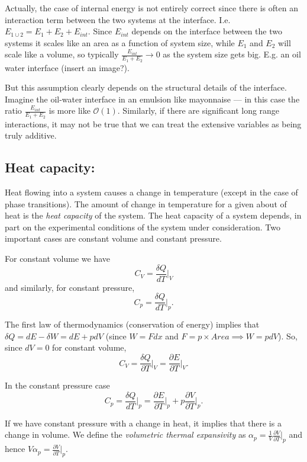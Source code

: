 Actually, the case of internal energy is not entirely correct since there is often an interaction term between the two systems at the interface. I.e. $E_{1\cup2} = E_1+E_2+E_{int}$. Since $E_{int}$ depends on the interface between the two systems it scales like an area as a function of system size, while $E_1$ and $E_2$ will scale like a volume, so typically $\frac{E_{int}}{E_1+E_2}\rightarrow0$ as the system size gets big. E.g. an oil water interface (insert an image?).

But this assumption clearly depends on the structural details of the interface. Imagine the oil-water interface in an emulsion like mayonnaise --- in this case the ratio  $\frac{E_{int}}{E_1+E_2}$ is more like $\mathcal{O}(1)$.
Similarly, if there are significant long range interactions, it may not be true that we can treat the extensive variables as being truly additive.

\subsection{Heat capacity:}
Heat flowing into a system causes a change in temperature (except in the case of phase transitions). The amount of change in temperature for a given about of heat is the \emph{heat capacity} of the system. The heat capacity of a system depends, in part on the experimental conditions of the system under consideration. Two important cases are constant volume and constant pressure.

For constant volume we have
$$C_V = \frac{\delta Q}{dT}\bigg\vert_V$$
and similarly, for constant pressure,
$$C_p = \frac{\delta Q}{dT}\bigg\vert_p.$$

The first law of thermodynamics (conservation of energy) implies that $\delta Q = dE - \delta W = dE + pdV$  (since $W = Fdx$ and $F=p\times Area \implies W = pdV$). So, since $dV=0$ for constant volume,
$$
	C_V = \frac{\delta Q}{\partial T}\bigg\vert_{V} = \frac{\partial E}{\partial T}\bigg\vert_{V}.
$$


In the constant pressure case 
$$
	C_p = \frac{\delta Q}{dT}\vert_{p} = \frac{\partial E}{\partial T}\vert_{p} + p\frac{\partial V}{\partial T}\vert_{p}.
$$

If we have constant pressure with a change in heat, it implies that there is a change in volume. We define the \emph{volumetric thermal expansivity} as $\alpha_p = \frac{1}{V}\frac{\partial V}{\partial T}\vert_{p}$ and hence $V\alpha_p =\frac{\partial V}{\partial T}\vert_{p}$.

